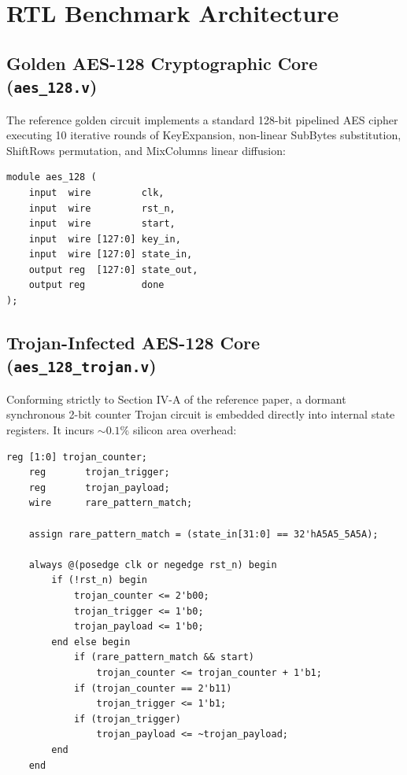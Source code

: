 \documentclass[11pt,a4paper,oneside]{book}
\begin{document}
\chapter{RTL Benchmark Architecture}

\section{Golden AES-128 Cryptographic Core (\texttt{aes\_128.v})}

The reference golden circuit implements a standard 128-bit pipelined AES cipher executing 10 iterative rounds of KeyExpansion, non-linear SubBytes substitution, ShiftRows permutation, and MixColumns linear diffusion:

\begin{lstlisting}[language=VerilogCustom, caption={Golden AES-128 Module Interface (\texttt{src/aes\_128.v})}]
module aes_128 (
    input  wire         clk,
    input  wire         rst_n,
    input  wire         start,
    input  wire [127:0] key_in,
    input  wire [127:0] state_in,
    output reg  [127:0] state_out,
    output reg          done
);
\end{lstlisting}

\section{Trojan-Infected AES-128 Core (\texttt{aes\_128\_trojan.v})}

Conforming strictly to Section IV-A of the reference paper, a dormant synchronous 2-bit counter Trojan circuit is embedded directly into internal state registers. It incurs $\sim 0.1\%$ silicon area overhead:

\begin{lstlisting}[language=VerilogCustom, caption={Synchronous 2-Bit Counter Trojan Logic (\texttt{src/aes\_128\_trojan.v})}]
    reg [1:0] trojan_counter;
    reg       trojan_trigger;
    reg       trojan_payload;
    wire      rare_pattern_match;

    assign rare_pattern_match = (state_in[31:0] == 32'hA5A5_5A5A);

    always @(posedge clk or negedge rst_n) begin
        if (!rst_n) begin
            trojan_counter <= 2'b00;
            trojan_trigger <= 1'b0;
            trojan_payload <= 1'b0;
        end else begin
            if (rare_pattern_match && start)
                trojan_counter <= trojan_counter + 1'b1;
            if (trojan_counter == 2'b11)
                trojan_trigger <= 1'b1;
            if (trojan_trigger)
                trojan_payload <= ~trojan_payload;
        end
    end
\end{lstlisting}
\end{document}
